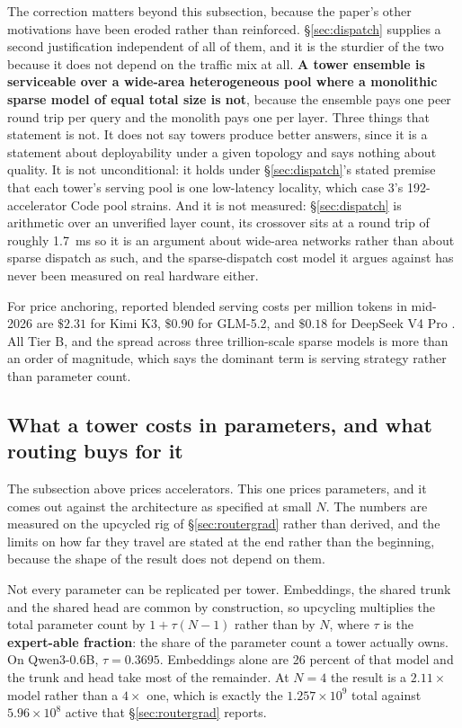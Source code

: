 \documentclass[11pt]{article}
\begin{document}
The correction matters beyond this subsection, because the paper's other motivations have been eroded rather than reinforced. \S\ref{sec:dispatch} supplies a second justification independent of all of them, and it is the sturdier of the two because it does not depend on the traffic mix at all. \textbf{A tower ensemble is serviceable over a wide-area heterogeneous pool where a monolithic sparse model of equal total size is not}, because the ensemble pays one peer round trip per query and the monolith pays one per layer. Three things that statement is not. It does not say towers produce better answers, since it is a statement about deployability under a given topology and says nothing about quality. It is not unconditional: it holds under \S\ref{sec:dispatch}'s stated premise that each tower's serving pool is one low-latency locality, which case 3's 192-accelerator Code pool strains. And it is not measured: \S\ref{sec:dispatch} is arithmetic over an unverified layer count, its crossover sits at a round trip of roughly 1.7~ms so it is an argument about wide-area networks rather than about sparse dispatch as such, and the sparse-dispatch cost model it argues against has never been measured on real hardware either.

For price anchoring, reported blended serving costs per million tokens in mid-2026 are $\$2.31$ for Kimi K3, $\$0.90$ for GLM-5.2, and $\$0.18$ for DeepSeek V4 Pro \cite{marktechpost2026}. All Tier B, and the spread across three trillion-scale sparse models is more than an order of magnitude, which says the dominant term is serving strategy rather than parameter count.

\subsection{What a tower costs in parameters, and what routing buys for it}
\label{sec:tau}

The subsection above prices accelerators. This one prices parameters, and it comes out against the architecture as specified at small $N$. The numbers are measured on the upcycled rig of \S\ref{sec:routergrad} rather than derived, and the limits on how far they travel are stated at the end rather than the beginning, because the shape of the result does not depend on them.

Not every parameter can be replicated per tower. Embeddings, the shared trunk and the shared head are common by construction, so upcycling multiplies the total parameter count by $1 + \tau(N-1)$ rather than by $N$, where $\tau$ is the \textbf{expert-able fraction}: the share of the parameter count a tower actually owns. On Qwen3-0.6B, $\tau = 0.3695$. Embeddings alone are 26 percent of that model and the trunk and head take most of the remainder. At $N = 4$ the result is a $2.11\times$ model rather than a $4\times$ one, which is exactly the $1.257\times10^{9}$ total against $5.96\times10^{8}$ active that \S\ref{sec:routergrad} reports.
\end{document}
